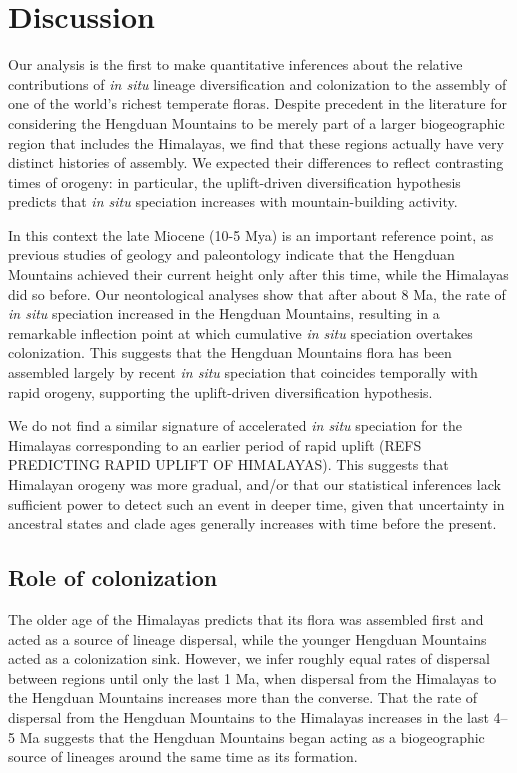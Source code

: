 \section{Discussion}

Our analysis is the first to make quantitative inferences about the relative contributions of \textit{in situ} lineage diversification and colonization to the assembly of one of the world's richest temperate floras. Despite precedent in the literature for considering the Hengduan Mountains to be merely part of a larger biogeographic region that includes the Himalayas, we find that these regions actually have very distinct histories of assembly. We expected their differences to reflect contrasting times of orogeny: in particular, the uplift-driven diversification hypothesis predicts that \textit{in situ} speciation increases with mountain-building activity.

In this context the late Miocene (10-5 Mya) is an important reference point, as previous studies of geology and paleontology indicate that the Hengduan Mountains achieved their current height only after this time, while the Himalayas did so before. Our neontological analyses show that after about 8 Ma, the rate of \textit{in situ} speciation increased in the Hengduan Mountains, resulting in a remarkable inflection point at which cumulative \textit{in situ} speciation overtakes colonization. This suggests that the Hengduan Mountains flora has been assembled largely by recent \textit{in situ} speciation that coincides temporally with rapid orogeny, supporting the uplift-driven diversification hypothesis.

We do not find a similar signature of accelerated \textit{in situ} speciation for the Himalayas corresponding to an earlier period of rapid uplift (REFS PREDICTING RAPID UPLIFT OF HIMALAYAS). This suggests that Himalayan orogeny was more gradual, and/or that our statistical inferences lack sufficient power to detect such an event in deeper time, given that uncertainty in ancestral states and clade ages generally increases with time before the present.

\subsection{Role of colonization}

The older age of the Himalayas predicts that its flora was assembled first and acted as a source of lineage dispersal, while the younger Hengduan Mountains acted as a colonization sink. However, we infer roughly equal rates of dispersal between regions until only the last 1 Ma, when dispersal from the Himalayas to the Hengduan Mountains increases more than the converse. That the rate of dispersal from the Hengduan Mountains to the Himalayas increases in the last 4--5 Ma suggests that the Hengduan Mountains began acting as a biogeographic source of lineages around the same time as its formation.

